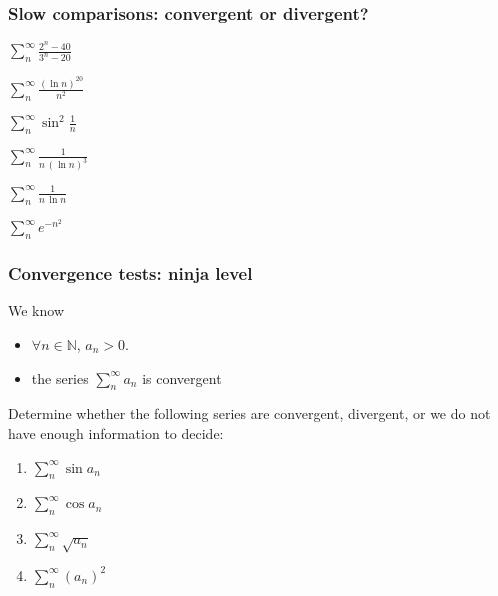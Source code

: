 \documentclass[14pt]{beamer}
\begin{document}
	\begin{frame}[t]
		\frametitle{Slow comparisons: convergent or divergent?}

		\begin{enumerate}
		\end{enumerate}
	\end{frame}

	\begin{frame}[t]
		\frametitle{Convergence tests: ninja level}

		We know
		\begin{itemize}
			\item $\displaystyle \forall n \in \mathbb{N}$, $\displaystyle a_{n}> 0$.

			\item the series $\displaystyle \sum_{n}^{\infty}a_{n}$ is convergent
		\end{itemize}

		Determine whether the following series are convergent, divergent, or we do not
		have enough information to decide:
		\begin{multicols}{2}
			\begin{enumerate}
				\item $\displaystyle \sum_{n}^{\infty}\sin a_{n}$

				\item $\displaystyle \sum_{n}^{\infty}\cos a_{n}$

				\item $\displaystyle \sum_{n}^{\infty}\sqrt{a_{n}}$

				\item $\displaystyle \sum_{n}^{\infty}\left( a_{n}\right)^{2}$
			\end{enumerate}
		\end{multicols}
	\end{frame}
\end{document}
